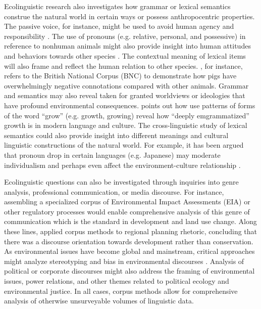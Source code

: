 Ecolinguistic research also investigates how grammar or lexical semantics construe the natural world in certain ways or possess anthropocentric properties. The passive voice, for instance, might be used to avoid human agency and responsibility \citep{Kahn2001a}. The use of pronouns (e.g. relative, personal, and possessive) in reference to nonhuman animals might also provide insight into human attitudes and behaviors towards other species \citep{Gilquin2006a}. The contextual meaning of lexical items will also frame and reflect the human relation to other species. \cite{Stibbe2003a}, for instance, refers to the British National Corpus (BNC) to demonstrate how pigs have overwhelmingly negative connotations compared with other animals. Grammar and semantics may also reveal taken for granted worldviews or ideologies that have profound environmental consequences. \cite*{Halliday2001a} points out how use patterns of forms of the word ``grow'' (e.g. growth, growing) reveal how ``deeply emgrammatized'' growth is in modern language and culture. The cross-linguistic study of lexical semantics could also provide insight into different meanings and cultural linguistic constructions of the natural world. For example, it has been argued that pronoun drop in certain languages (e.g. Japanese) may moderate individualism and perhaps even affect the environment-culture relationship \citep{Kashima2003a}. 

Ecolinguistic questions can also be investigated through inquiries into genre analysis, professional communication, or media discourse. For instance, assembling a specialized corpus of Environmental Impact Assessments (EIA) or other regulatory processes would enable comprehensive analysis of this genre of communication which is the standard in development and land use change. Along these lines, \cite{Sousa2012} applied corpus methods to regional planning rhetoric, concluding that there was a discourse orientation towards development rather than conservation. As environmental issues have become global and mainstream, critical approaches might analyze stereotyping and bias in environmental discourses \citep{Muhlhausler2006b}. Analysis of political or corporate discourses might also address the framing of environmental issues, power relations, and other themes related to political ecology and environmental justice. In all cases, corpus methods allow for comprehensive analysis of otherwise unsurveyable volumes of linguistic data.


